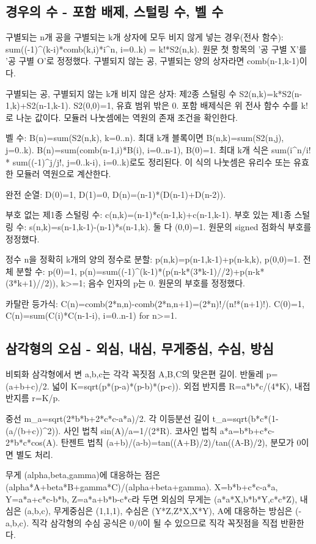 \documentclass[landscape,8pt,a4paper,twocolumn]{extarticle}
\begin{document}
\subsection{경우의 수 - 포함 배제, 스털링 수, 벨 수}
\noindent 구별되는 n개 공을 구별되는 k개 상자에 모두 비지 않게 넣는 경우(전사 함수): sum((-1)\textasciicircum{}(k-i)*comb(k,i)*i\textasciicircum{}n, i=0..k) = k!*S2(n,k). 원문 첫 항목의 '공 구별 X'를 '공 구별 O'로 정정했다. 구별되지 않는 공, 구별되는 양의 상자라면 comb(n-1,k-1)이다.\par\smallskip
\noindent 구별되는 공, 구별되지 않는 k개 비지 않은 상자: 제2종 스털링 수 S2(n,k)=k*S2(n-1,k)+S2(n-1,k-1). S2(0,0)=1, 유효 범위 밖은 0. 포함 배제식은 위 전사 함수 수를 k!로 나눈 값이다. 모듈러 나눗셈에는 역원의 존재 조건을 확인한다.\par\smallskip
\noindent 벨 수: B(n)=sum(S2(n,k), k=0..n). 최대 k개 블록이면 B(n,k)=sum(S2(n,j), j=0..k). B(n)=sum(comb(n-1,i)*B(i), i=0..n-1), B(0)=1. 최대 k개 식은 sum(i\textasciicircum{}n/i! * sum((-1)\textasciicircum{}j/j!, j=0..k-i), i=0..k)로도 정리된다. 이 식의 나눗셈은 유리수 또는 유효한 모듈러 역원으로 계산한다.\par\smallskip
\noindent 완전 순열: D(0)=1, D(1)=0, D(n)=(n-1)*(D(n-1)+D(n-2)).\par\smallskip
\noindent 부호 없는 제1종 스털링 수: c(n,k)=(n-1)*c(n-1,k)+c(n-1,k-1). 부호 있는 제1종 스털링 수: s(n,k)=s(n-1,k-1)-(n-1)*s(n-1,k). 둘 다 (0,0)=1. 원문의 signed 점화식 부호를 정정했다.\par\smallskip
\noindent 정수 n을 정확히 k개의 양의 정수로 분할: p(n,k)=p(n-1,k-1)+p(n-k,k), p(0,0)=1. 전체 분할 수: p(0)=1, p(n)=sum((-1)\textasciicircum{}(k-1)*(p(n-k*(3*k-1)//2)+p(n-k*(3*k+1)//2)), k>=1; 음수 인자의 p는 0. 원문의 부호를 정정했다.\par\smallskip
\noindent 카탈란 등가식: C(n)=comb(2*n,n)-comb(2*n,n+1)=(2*n)!/(n!*(n+1)!). C(0)=1, C(n)=sum(C(i)*C(n-1-i), i=0..n-1) for n>=1.\par\smallskip
\subsection{삼각형의 오심 - 외심, 내심, 무게중심, 수심, 방심}
\noindent 비퇴화 삼각형에서 변 a,b,c는 각각 꼭짓점 A,B,C의 맞은편 길이. 반둘레 p=(a+b+c)/2. 넓이 K=sqrt(p*(p-a)*(p-b)*(p-c)). 외접 반지름 R=a*b*c/(4*K), 내접 반지름 r=K/p.\par\smallskip
\noindent 중선 m\_a=sqrt(2*b*b+2*c*c-a*a)/2. 각 이등분선 길이 t\_a=sqrt(b*c*(1-(a/(b+c))\textasciicircum{}2)). 사인 법칙 sin(A)/a=1/(2*R). 코사인 법칙 a*a=b*b+c*c-2*b*c*cos(A). 탄젠트 법칙 (a+b)/(a-b)=tan((A+B)/2)/tan((A-B)/2), 분모가 0이면 별도 처리.\par\smallskip
\noindent 무게 (alpha,beta,gamma)에 대응하는 점은 (alpha*A+beta*B+gamma*C)/(alpha+beta+gamma). X=b*b+c*c-a*a, Y=a*a+c*c-b*b, Z=a*a+b*b-c*c라 두면 외심의 무게는 (a*a*X,b*b*Y,c*c*Z), 내심은 (a,b,c), 무게중심은 (1,1,1), 수심은 (Y*Z,Z*X,X*Y), A에 대응하는 방심은 (-a,b,c). 직각 삼각형의 수심 공식은 0/0이 될 수 있으므로 직각 꼭짓점을 직접 반환한다.\par\smallskip
\end{document}
